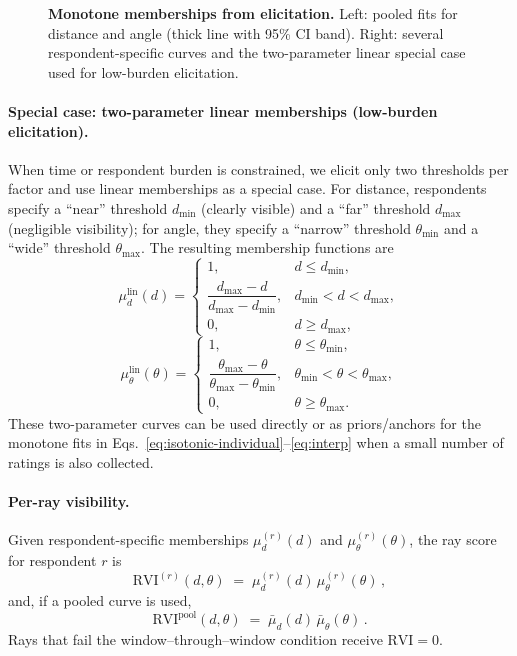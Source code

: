 \documentclass[final,3p,times,review]{elsarticle}
\begin{document}
\begin{figure}[t]
  \centering
  \caption{\textbf{Monotone memberships from elicitation.} Left: pooled fits for distance and angle (thick line with 95\% CI band). Right: several respondent-specific curves and the two-parameter linear special case used for low-burden elicitation.}
  \label{fig:memberships}
\end{figure}

\paragraph{Special case: two-parameter linear memberships (low-burden elicitation).}
When time or respondent burden is constrained, we elicit only two thresholds per factor and use linear memberships as a special case. For distance, respondents specify a ``near'' threshold $d_{\min}$ (clearly visible) and a ``far'' threshold $d_{\max}$ (negligible visibility); for angle, they specify a ``narrow'' threshold $\theta_{\min}$ and a ``wide'' threshold $\theta_{\max}$. The resulting membership functions are
\begin{equation}
\mu^{\mathrm{lin}}_d(d)=
\begin{cases}
1, & d \le d_{\min},\\
\dfrac{d_{\max}-d}{d_{\max}-d_{\min}}, & d_{\min}<d<d_{\max},\\
0, & d \ge d_{\max},
\end{cases}
\label{eq:linear-distance}
\end{equation}
\begin{equation}
\mu^{\mathrm{lin}}_\theta(\theta)=
\begin{cases}
1, & \theta \le \theta_{\min},\\
\dfrac{\theta_{\max}-\theta}{\theta_{\max}-\theta_{\min}}, & \theta_{\min}<\theta<\theta_{\max},\\
0, & \theta \ge \theta_{\max}.
\end{cases}
\label{eq:linear-angle}
\end{equation}
These two-parameter curves can be used directly or as priors/anchors for the monotone fits in Eqs.~\eqref{eq:isotonic-individual}--\eqref{eq:interp} when a small number of ratings is also collected.

\paragraph{Per-ray visibility.}
Given respondent-specific memberships $\mu^{(r)}_d(d)$ and $\mu^{(r)}_\theta(\theta)$, the ray score for respondent $r$ is
\begin{equation}
\mathrm{RVI}^{(r)}(d,\theta) \;=\; \mu^{(r)}_d(d)\,\mu^{(r)}_\theta(\theta)\,,
\label{eq:rvi-individual}
\end{equation}
and, if a pooled curve is used,
\begin{equation}
\mathrm{RVI}^{\mathrm{pool}}(d,\theta) \;=\; \bar{\mu}_d(d)\,\bar{\mu}_\theta(\theta)\,.
\label{eq:rvi-pooled}
\end{equation}
Rays that fail the window–through–window condition receive $\mathrm{RVI}=0$.
\end{document}
